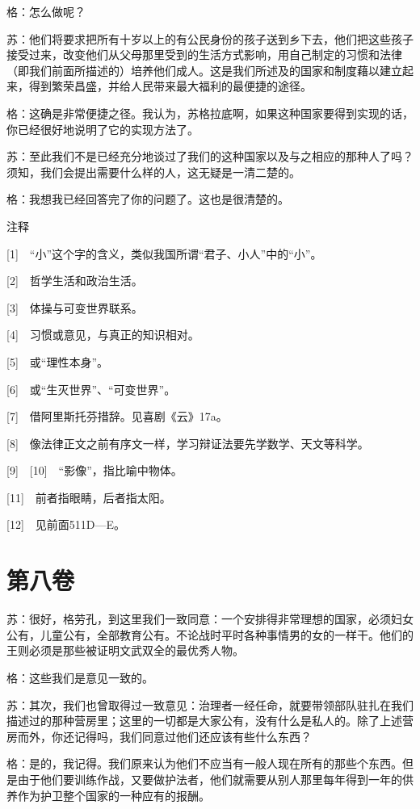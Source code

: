 \documentclass[12pt,oneside]{book}
\begin{document}
格：怎么做呢？

苏：他们将要求把所有十岁以上的有公民身份的孩子送到乡下去，他们把这些孩子接受过来，改变他们从父母那里受到的生活方式影响，用自己制定的习惯和法律（即我们前面所描述的）培养他们成人。这是我们所述及的国家和制度藉以建立起来，得到繁荣昌盛，并给人民带来最大福利的最便捷的途径。

格：这确是非常便捷之径。我认为，苏格拉底啊，如果这种国家要得到实现的话，你已经很好地说明了它的实现方法了。

苏：至此我们不是已经充分地谈过了我们的这种国家以及与之相应的那种人了吗？须知，我们会提出需要什么样的人，这无疑是一清二楚的。

格：我想我已经回答完了你的问题了。这也是很清楚的。

注释

[1]　“小”这个字的含义，类似我国所谓“君子、小人”中的“小”。

[2]　哲学生活和政治生活。

[3]　体操与可变世界联系。

[4]　习惯或意见，与真正的知识相对。

[5]　或“理性本身”。

[6]　或“生灭世界”、“可变世界”。

[7]　借阿里斯托芬措辞。见喜剧《云》17a。

[8]　像法律正文之前有序文一样，学习辩证法要先学数学、天文等科学。

[9]　[10]　“影像”，指比喻中物体。

[11]　前者指眼睛，后者指太阳。

[12]　见前面511D—E。





\chapter{第八卷}

苏：很好，格劳孔，到这里我们一致同意：一个安排得非常理想的国家，必须妇女公有，儿童公有，全部教育公有。不论战时平时各种事情男的女的一样干。他们的王则必须是那些被证明文武双全的最优秀人物。

格：这些我们是意见一致的。

苏：其次，我们也曾取得过一致意见：治理者一经任命，就要带领部队驻扎在我们描述过的那种营房里；这里的一切都是大家公有，没有什么是私人的。除了上述营房而外，你还记得吗，我们同意过他们还应该有些什么东西？

格：是的，我记得。我们原来认为他们不应当有一般人现在所有的那些个东西。但是由于他们要训练作战，又要做护法者，他们就需要从别人那里每年得到一年的供养作为护卫整个国家的一种应有的报酬。
\end{document}
